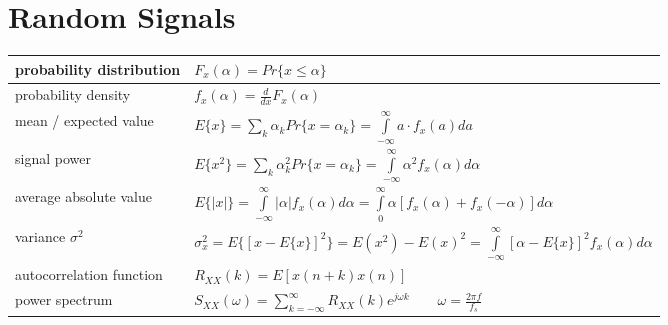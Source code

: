 \section{Random Signals}
\begin{tabularx}{\linewidth}{|l|X|}
	\hline
	probability distribution & $F_x(\alpha) = Pr\{x \leq \alpha \}$ \\
	\hline
	probability density & $f_x(\alpha) = \frac{d}{dx}F_x(\alpha)$\\
	\hline
	mean / expected value & $E\{x\} = \sum\limits_k \alpha_k Pr\{x = \alpha_k\} =
	\int\limits_{-\infty}^{\infty}a\cdot f_x(a)da$
	\\
	\hline
	signal power & $E\{ x^2 \} = \sum\limits_k \alpha_k^2 Pr\{x = \alpha_k\} =
	\int\limits_{-\infty}^{\infty} \alpha^2 f_x(\alpha) d\alpha$ \\
	\hline
	average absolute value & $E\{ |x| \} = \int\limits_{-\infty}^{\infty} |\alpha| f_x(\alpha) d\alpha 
										 = \int\limits_{0}^{\infty} \alpha[f_x(\alpha) + f_x(-\alpha)] d\alpha $
	\\ \hline
	variance $\sigma^2$ & 
	$\sigma_x^2 = E\{ [x-E\{ x \}]^2 \} = E(x^2) - E(x)^2 = \int\limits_{-\infty}^{\infty}[\alpha - E\{ x \}]^2 f_x(\alpha) d\alpha $
	\\ \hline
	autocorrelation function & 
	$R_{XX}(k) = E[x(n+k)x(n)]$
	\\ \hline
	power spectrum & 
	$S_{XX}(\omega) = \sum\limits_{k=-\infty}^{\infty} R_{XX}(k)e^{j\omega k} \qquad \omega = \frac{2\pi f}{f_s} $
	\\ \hline
\end{tabularx}